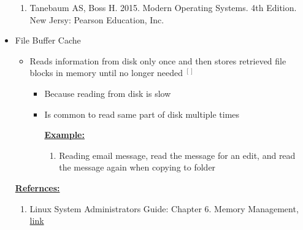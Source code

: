 \documentclass[12pt]{article}
\begin{document}
\begin{itemize}
    \begin{enumerate}[1)]
        \item Tanebaum AS, Boss H. 2015. Modern Operating Systems. 4th Edition. New Jersy: Pearson Education, Inc.
    \end{enumerate}
    \item File Buffer Cache
    \begin{itemize}
        \item Reads information from disk only once and then stores retrieved file blocks
        in memory until no longer needed $^{[]}$
        \begin{itemize}
            \item Because reading from disk is slow
            \item Is common to read same part of disk multiple times

            \bigskip

            \underline{\textbf{Example:}}

            \bigskip

            \begin{enumerate}[1.]
                \item Reading email message, read the message for an edit, and
                read the message again when copying to folder
            \end{enumerate}
        \end{itemize}
    \end{itemize}

    \bigskip

    \underline{\textbf{Refernces:}}

    \bigskip

    \begin{enumerate}[1)]
        \item Linux System Administrators Guide: Chapter 6. Memory Management, \href{https://www.tldp.org/LDP/sag/html/buffer-cache.html}{link}
    \end{enumerate}
\end{itemize}
\end{document}
